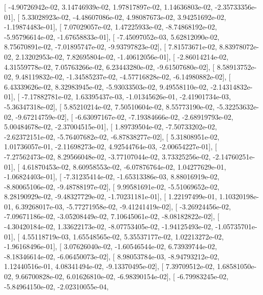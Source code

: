 \documentclass{article}
\begin{document}
       [ -4.90726942e-02,   3.14746939e-02,   1.97817897e-02,
          1.14636803e-02,  -2.35733356e-01],
       [  5.33028923e-02,  -4.48607086e-02,   4.98087673e-02,
          3.94251692e-02,  -1.19874483e-01],
       [  7.07029057e-02,   1.47225933e-02,  -8.74868192e-02,
         -5.95796614e-02,  -1.67658833e-01],
       [ -7.45097052e-03,   5.62812090e-02,   8.75670891e-02,
         -7.01895747e-02,  -9.93797823e-02],
       [  7.81573671e-02,   8.83978072e-02,   2.13202953e-02,
          7.82695804e-02,  -1.40612056e-01],
       [ -2.86014214e-02,   4.31559778e-02,   7.05763266e-02,
          6.23443280e-02,  -9.61507680e-02],
       [  8.58913752e-02,   9.48119832e-02,  -1.34585237e-02,
         -4.57716828e-02,  -6.14980882e-02],
       [  6.43339626e-02,   8.32983945e-02,  -5.93033503e-02,
          9.49558110e-02,  -2.14314832e-01],
       [ -7.17882781e-02,   1.63395437e-03,  -1.01345626e-01,
         -2.41901734e-03,  -5.36347318e-02],
       [  5.85210214e-02,   7.50510604e-02,   8.55773190e-02,
         -5.32253632e-02,  -9.67214759e-02],
       [ -6.63097167e-02,  -7.19384666e-02,  -2.68919793e-02,
          5.00484678e-02,  -2.37004515e-01],
       [  1.89739504e-02,  -7.50733202e-02,  -2.62372151e-02,
         -5.76407682e-02,  -6.87838277e-02],
       [  5.31808951e-02,   1.01736057e-01,  -2.11698273e-02,
          4.92544764e-03,  -2.00654227e-01],
       [ -7.27562473e-02,   8.29566048e-02,  -3.77107044e-02,
          3.73325256e-02,  -2.14760251e-01],
       [  4.61870453e-02,   8.60958553e-02,  -6.07876764e-02,
          1.04277629e-01,  -1.06824403e-01],
       [ -7.31235414e-02,  -1.65313386e-03,   8.88016919e-02,
         -8.80065106e-02,  -9.48788197e-02],
       [  9.99581691e-02,  -5.51069652e-02,   8.28190929e-02,
         -9.48327729e-02,  -1.70231181e-01],
       [  1.22197499e-01,   1.10320198e-01,   6.39268017e-03,
         -5.77271958e-02,  -9.41241419e-02],
       [ -3.26924456e-02,  -7.09671186e-02,  -3.05208449e-02,
          7.10645061e-02,  -8.08182822e-02],
       [ -4.30420184e-02,   1.33622173e-02,  -8.07753405e-02,
         -1.94125493e-02,  -1.05735701e-01],
       [  4.55118719e-03,   1.65548565e-02,   5.35537177e-02,
          1.02213272e-02,  -1.96168496e-01],
       [  3.07626040e-02,  -1.60546544e-02,   6.73939744e-02,
         -8.18346614e-02,  -6.06450073e-02],
       [  8.98053784e-03,  -8.94793212e-02,   1.12440516e-01,
          4.08341494e-02,  -9.13370495e-02],
       [  7.39709512e-02,   1.68581050e-02,   9.66700828e-02,
          6.01626810e-02,  -6.98390154e-02],
       [ -6.79983245e-02,  -5.84964150e-02,  -2.02310055e-04,
\end{document}
